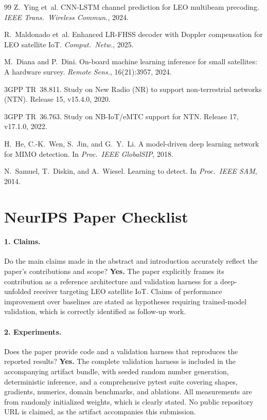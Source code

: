 \documentclass{article}
\begin{document}
{\begin{thebibliography}{99}
Z.~Ying et~al.
\newblock CNN-LSTM channel prediction for LEO multibeam precoding.
\newblock \emph{IEEE Trans.\ Wireless Commun.}, 2024.

R.~Maldonado et~al.
\newblock Enhanced LR-FHSS decoder with Doppler compensation for LEO satellite IoT.
\newblock \emph{Comput.\ Netw.}, 2025.

M.~Diana and P.~Dini.
\newblock On-board machine learning inference for small satellites: A hardware survey.
\newblock \emph{Remote Sens.}, 16(21):3957, 2024.

3GPP TR~38.811.
\newblock Study on New Radio (NR) to support non-terrestrial networks (NTN).
\newblock Release 15, v15.4.0, 2020.

3GPP TR~36.763.
\newblock Study on NB-IoT/eMTC support for NTN.
\newblock Release 17, v17.1.0, 2022.

H.~He, C.-K.~Wen, S.~Jin, and G.~Y.~Li.
\newblock A model-driven deep learning network for MIMO detection.
\newblock In \emph{Proc.\ IEEE GlobalSIP}, 2018.

N.~Samuel, T.~Diskin, and A.~Wiesel.
\newblock Learning to detect.
\newblock In \emph{Proc.\ IEEE SAM}, 2014.

\end{thebibliography}
}

\appendix
\section{NeurIPS Paper Checklist}

\paragraph{1. Claims.}
Do the main claims made in the abstract and introduction accurately reflect the paper's contributions and scope?
\textbf{Yes.} The paper explicitly frames its contribution as a reference architecture and validation harness for a deep-unfolded receiver targeting LEO satellite IoT. Claims of performance improvement over baselines are stated as hypotheses requiring trained-model validation, which is correctly identified as follow-up work.

\paragraph{2. Experiments.}
Does the paper provide code and a validation harness that reproduces the reported results?
\textbf{Yes.} The complete validation harness is included in the accompanying artifact bundle, with seeded random number generation, deterministic inference, and a comprehensive pytest suite covering shapes, gradients, numerics, domain benchmarks, and ablations. All measurements are from randomly initialized weights, which is clearly stated. No public repository URL is claimed, as the artifact accompanies this submission.
\end{document}
